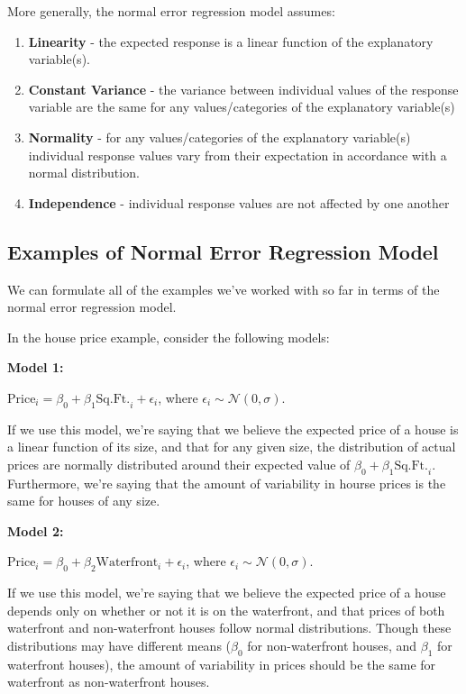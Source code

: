 \documentclass[
  letterpaper,
  DIV=11,
  numbers=noendperiod]{scrreprt}
\begin{document}
More generally, the normal error regression model assumes:

\begin{enumerate}
\def\labelenumi{\arabic{enumi}.}
\item
  \textbf{Linearity} - the expected response is a linear function of the
  explanatory variable(s).
\item
  \textbf{Constant Variance} - the variance between individual values of
  the response variable are the same for any values/categories of the
  explanatory variable(s)
\item
  \textbf{Normality} - for any values/categories of the explanatory
  variable(s) individual response values vary from their expectation in
  accordance with a normal distribution.
\item
  \textbf{Independence} - individual response values are not affected by
  one another
\end{enumerate}

\subsection{Examples of Normal Error Regression
Model}\label{examples-of-normal-error-regression-model}

We can formulate all of the examples we've worked with so far in terms
of the normal error regression model.

In the house price example, consider the following models:

\textbf{Model 1:}

\(\text{Price}_i = \beta_0 + \beta_1\text{Sq.Ft.}_{i} + \epsilon_i\),
where \(\epsilon_i\sim\mathcal{N}(0,\sigma)\).

If we use this model, we're saying that we believe the expected price of
a house is a linear function of its size, and that for any given size,
the distribution of actual prices are normally distributed around their
expected value of \(\beta_0 + \beta_1\text{Sq.Ft.}_{i}\). Furthermore,
we're saying that the amount of variability in hourse prices is the same
for houses of any size.

\textbf{Model 2:}

\(\text{Price}_i = \beta_0 + \beta_2\text{Waterfront}_{i}+ \epsilon_i\),
where \(\epsilon_i\sim\mathcal{N}(0,\sigma)\).

If we use this model, we're saying that we believe the expected price of
a house depends only on whether or not it is on the waterfront, and that
prices of both waterfront and non-waterfront houses follow normal
distributions. Though these distributions may have different means
(\(\beta_0\) for non-waterfront houses, and \(\beta_1\) for waterfront
houses), the amount of variability in prices should be the same for
waterfront as non-waterfront houses.
\end{document}
